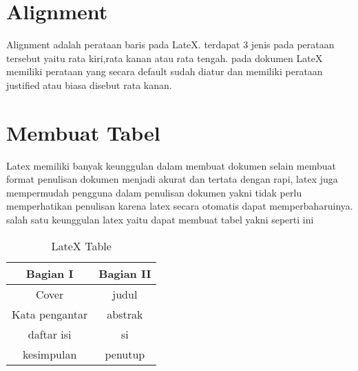 \section{Alignment}
Alignment adalah perataan baris pada LateX. terdapat 3 jenis pada perataan tersebut yaitu rata kiri,rata kanan atau rata tengah. pada dokumen LateX memiliki perataan yang secara default sudah diatur dan memiliki perataan justified atau biasa disebut rata kanan.

\section{Membuat Tabel}
Latex memiliki banyak keunggulan dalam membuat dokumen selain membuat format penulisan dokumen menjadi akurat dan tertata dengan rapi, latex juga mempermudah pengguna dalam penulisan dokumen yakni tidak perlu memperhatikan penulisan karena latex secara otomatis dapat memperbaharuinya. salah satu keunggulan latex yaitu dapat membuat tabel yakni seperti ini

\begin{table}[h]
\caption{LateX Table}
\centering
\begin{tabular}{|c|c|}
\hline
\textbf{Bagian I}&\textbf{Bagian II}\\
\hline
Cover&judul\\
\hline
Kata pengantar&abstrak\\
\hline
daftar isi&si\\
\hline
kesimpulan&penutup\\
\hline
\end{tabular}
\label{table:permisalan}
\end{table}

